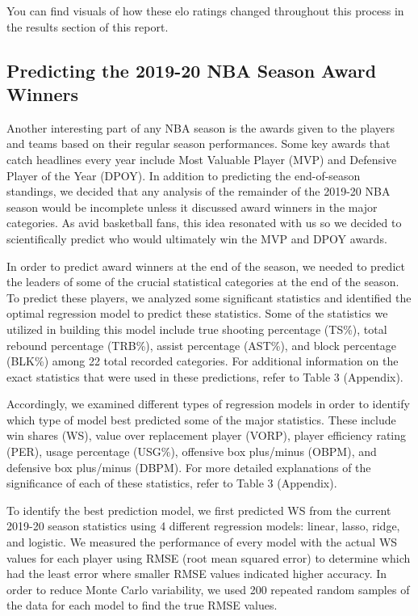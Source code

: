 \documentclass[]{article}
\begin{document}
You can find visuals of how these elo ratings changed throughout this
process in the results section of this report.

\hypertarget{predicting-the-2019-20-nba-season-award-winners}{%
\subsection{Predicting the 2019-20 NBA Season Award
Winners}\label{predicting-the-2019-20-nba-season-award-winners}}

Another interesting part of any NBA season is the awards given to the
players and teams based on their regular season performances. Some key
awards that catch headlines every year include Most Valuable Player
(MVP) and Defensive Player of the Year (DPOY). In addition to predicting
the end-of-season standings, we decided that any analysis of the
remainder of the 2019-20 NBA season would be incomplete unless it
discussed award winners in the major categories. As avid basketball
fans, this idea resonated with us so we decided to scientifically
predict who would ultimately win the MVP and DPOY awards.

In order to predict award winners at the end of the season, we needed to
predict the leaders of some of the crucial statistical categories at the
end of the season. To predict these players, we analyzed some
significant statistics and identified the optimal regression model to
predict these statistics. Some of the statistics we utilized in building
this model include true shooting percentage (TS\%), total rebound
percentage (TRB\%), assist percentage (AST\%), and block percentage
(BLK\%) among 22 total recorded categories. For additional information
on the exact statistics that were used in these predictions, refer to
Table 3 (Appendix).

Accordingly, we examined different types of regression models in order
to identify which type of model best predicted some of the major
statistics. These include win shares (WS), value over replacement player
(VORP), player efficiency rating (PER), usage percentage (USG\%),
offensive box plus/minus (OBPM), and defensive box plus/minus (DBPM).
For more detailed explanations of the significance of each of these
statistics, refer to Table 3 (Appendix).

To identify the best prediction model, we first predicted WS from the
current 2019-20 season statistics using 4 different regression models:
linear, lasso, ridge, and logistic. We measured the performance of every
model with the actual WS values for each player using RMSE (root mean
squared error) to determine which had the least error where smaller RMSE
values indicated higher accuracy. In order to reduce Monte Carlo
variability, we used 200 repeated random samples of the data for each
model to find the true RMSE values.
\end{document}
